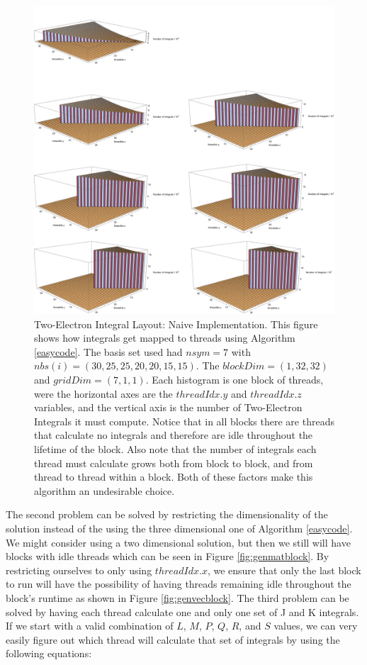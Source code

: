 \documentclass[12pt]{report}
\begin{document}
\begin{figure}[h!]
\includegraphics[width=1\textwidth]{Figures/30_25_20_15_naive_layout.png}
\caption[Two-Electron Integral Layout: Naive Implementation]
{Two-Electron Integral Layout: Naive Implementation. This figure shows how integrals get mapped to threads using Algorithm \ref{easycode}. The basis set used had $nsym = 7$ with $nbs(i)=(30,25,25,20,20,15,15)$. The $blockDim = (1, 32, 32)$ and $gridDim = (7, 1, 1)$. Each histogram is one block of threads, were the horizontal axes are the $threadIdx.y$ and $threadIdx.z$ variables, and the vertical axis is the number of Two-Electron Integrals it must compute. Notice that in all blocks there are threads that calculate no integrals and therefore are idle throughout the lifetime of the block. Also note that the number of integrals each thread must calculate grows both from block to block, and from thread to thread within a block. Both of these factors make this algorithm an undesirable choice.}
\label{fig:naivelayout}
\end{figure}

The second problem can be solved by restricting the dimensionality of the solution instead of the using the three dimensional one of Algorithm \ref{easycode}. We might consider using a two dimensional solution, but then we still will have blocks with idle threads which can be seen in Figure \ref{fig:genmatblock}. By restricting ourselves to only using $threadIdx.x$, we ensure that only the last block to run will have the possibility of having threads remaining idle throughout the block's runtime as shown in Figure \ref{fig:genvecblock}. The third problem can be solved by having each thread calculate one and only one set of J and K integrals. If we start with a valid combination of $L$, $M$, $P$, $Q$, $R$, and $S$ values, we can very easily figure out which thread will calculate that set of integrals by using the following equations:
\end{document}
